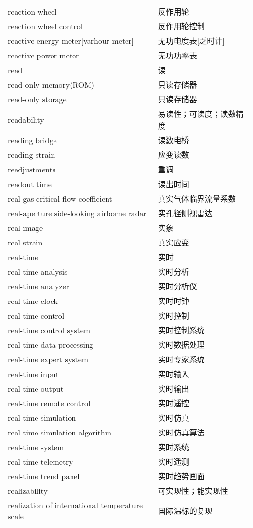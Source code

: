 \documentclass[
]{article}
\begin{document}
\begin{longtable}[]{@{}ll@{}}
reaction wheel & 反作用轮 \\
reaction wheel control & 反作用轮控制 \\
reactive energy meter{[}varhour meter{]} & 无功电度表{[}乏时计{]} \\
reactive power meter & 无功功率表 \\
read & 读 \\
read-only memory(ROM) & 只读存储器 \\
read-only storage & 只读存储器 \\
readability & 易读性；可读度；读数精 度 \\
reading bridge & 读数电桥 \\
reading strain & 应变读数 \\
readjustments & 重调 \\
readout time & 读出时间 \\
real gas critical flow coefficient & 真实气体临界流量系数 \\
real-aperture side-looking airborne radar & 实孔径侧视雷达 \\
real image & 实象 \\
real strain & 真实应变 \\
real-time & 实时 \\
real-time analysis & 实时分析 \\
real-time analyzer & 实时分析仪 \\
real-time clock & 实时时钟 \\
real-time control & 实时控制 \\
real-time control system & 实时控制系统 \\
real-time data processing & 实时数据处理 \\
real-time expert system & 实时专家系统 \\
real-time input & 实时输入 \\
real-time output & 实时输出 \\
real-time remote control & 实时遥控 \\
real-time simulation & 实时仿真 \\
real-time simulation algorithm & 实时仿真算法 \\
real-time system & 实时系统 \\
real-time telemetry & 实时遥测 \\
real-time trend panel & 实时趋势画面 \\
realizability & 可实现性；能实现性 \\
realization of international temperature scale & 国际温标的复现 \\

\end{longtable}
\end{document}
